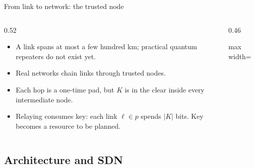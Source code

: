 \documentclass[10pt]{beamer}
\begin{document}
\begin{frame}{From link to network: the trusted node}
  \begin{columns}[c]
    \begin{column}{0.52\textwidth}
      \begin{itemize}
        \item A link spans at most a few hundred km; practical quantum
              repeaters do not exist yet.
        \item Real networks chain links through \alert{trusted nodes}.
        \item Each hop is a one-time pad, but $K$ is in the clear inside
              every intermediate node.
        \item Relaying \alert{consumes key}: each link $\ell\in p$ spends
              $|K|$ bits. Key becomes a resource to be planned.
      \end{itemize}
    \end{column}
    \begin{column}{0.46\textwidth}
      \begin{center}\begin{adjustbox}{max width=\linewidth}
      \end{adjustbox}\end{center}
    \end{column}
  \end{columns}
\end{frame}

\subsection{Architecture and SDN}
\end{document}
